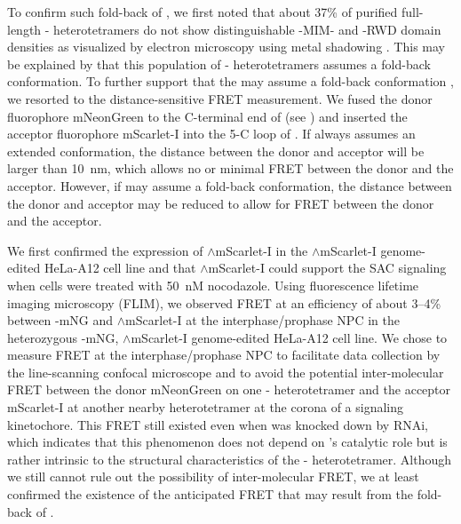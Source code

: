 To confirm such fold-back of , we first noted that about 37\% of purified full-length - heterotetramers do not show distinguishable -MIM- and -RWD domain densities as visualized by electron microscopy using metal shadowing \cite{BUB1-CDC20-MAD1}. This may be explained by that this population of - heterotetramers assumes a fold-back conformation. To further support that the  may assume a fold-back conformation , we resorted to the distance-sensitive FRET measurement. We fused the donor fluorophore mNeonGreen to the C-terminal end of  (see ) and inserted the acceptor fluorophore mScarlet-I into the \textbeta{}5-\textalpha{}C loop of  \cite{mSI, beta5-alphaCLoop}. If  always assumes an extended conformation, the distance between the donor and acceptor will be larger than \SI{10}{nm}, which allows no or minimal FRET between the donor and the acceptor. However, if  may assume a fold-back conformation, the distance between the donor and acceptor may be reduced to allow for FRET between the donor and the acceptor.

We first confirmed the expression of $\wedge$mScarlet-I in the $\wedge$mScarlet-I genome-edited HeLa-A12 cell line and that $\wedge$mScarlet-I could support the SAC signaling when cells were treated with \SI{50}{nM} nocodazole. Using fluorescence lifetime imaging microscopy (FLIM), we observed FRET at an efficiency of about 3--4\% between -mNG and $\wedge$mScarlet-I at the interphase/prophase NPC in the heterozygous -mNG, $\wedge$mScarlet-I genome-edited HeLa-A12 cell line. We chose to measure FRET at the interphase/prophase NPC to facilitate data collection by the line-scanning confocal microscope and to avoid the potential inter-molecular FRET between the donor mNeonGreen on one - heterotetramer and the acceptor mScarlet-I at another nearby heterotetramer at the corona of a signaling kinetochore. This FRET still existed even when  was knocked down by RNAi, which indicates that this phenomenon does not depend on 's catalytic role but is rather intrinsic to the structural characteristics of the - heterotetramer. Although we still cannot rule out the possibility of inter-molecular FRET, we at least confirmed the existence of the anticipated FRET that may result from the fold-back of  .
%  

